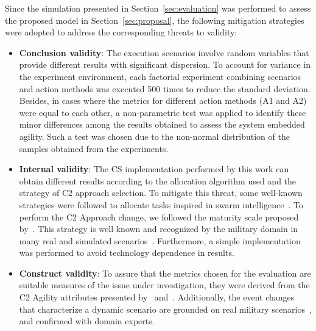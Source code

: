 
Since the simulation presented in Section~\ref{sec:evaluation} was performed to assess the proposed model in Section~\ref{sec:proposal}, the following mitigation strategies were adopted to address the corresponding threats to validity: 

\begin{itemize}
   \item \textbf{Conclusion validity}: The execution scenarios involve random variables that provide different results with significant dispersion. To account for variance in the experiment environment, each factorial experiment combining scenarios and action methods was executed 500 times to reduce the standard deviation. Besides, in cases where the metrics for different action methods (A1 and A2) were equal to each other, a non-parametric test was applied to identify these minor differences among the results obtained to assess the system embedded agility. Such a test was chosen due to the non-normal distribution of the samples obtained from the experiments.
   
   
   \item \textbf{Internal validity}: The CS implementation performed by this work can obtain different results according to the allocation algorithm used and the strategy of C2 approach selection. To mitigate this threat, some well-known strategies were followed to allocate tasks inspired in swarm intelligence~\citep{MAS07, UAV01}. To perform the C2 Approach change, we followed the maturity scale proposed by~\citet{nato01}. This strategy is well known and recognized by the military domain in many real and simulated scenarios~\citep{FRANCE2014}. Furthermore, a simple implementation was performed to avoid technology dependence in results.
   
   
   \item \textbf{Construct validity}: To assure that the metrics chosen for the evaluation are suitable measures of the issue under investigation, they were derived from the C2 Agility attributes presented by~\citet{Alberts2006} and~\citet{nato01}. Additionally, the event changes that characterize a dynamic scenario are grounded on real military scenarios~\citep{UAV_Aplication, Power01}, and confirmed with domain experts.
   

\end{itemize}
